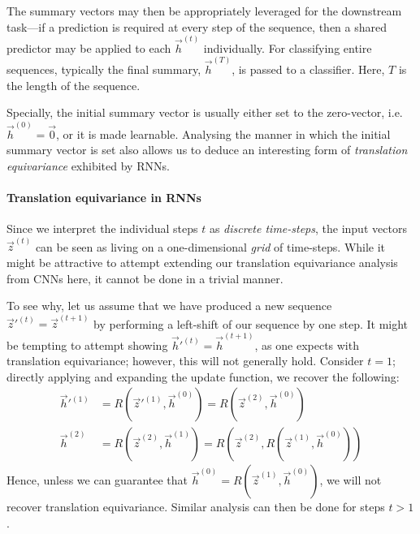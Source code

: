 The summary vectors may then be appropriately leveraged for the downstream task---if
a prediction is required at every step of the sequence, then a shared predictor may be applied
to each $\vec{h}^{(t)}$ individually. For classifying entire sequences, typically the final summary, $\vec{h}^{(T)}$, is passed to a classifier. Here, $T$ is the length of the sequence.

Specially, the initial summary vector is usually either set to the zero-vector, i.e. $\vec{h}^{(0)}=\vec{0}$, or it is made learnable. Analysing the manner in which the initial summary vector is set also allows us to deduce an interesting form of \emph{translation equivariance} exhibited by RNNs.

\paragraph{Translation equivariance in RNNs} Since we interpret the individual steps $t$ as \emph{discrete time-steps}, the input vectors $\vec{z}^{(t)}$ can be seen as living on a one-dimensional \emph{grid} of time-steps. While it might be attractive to attempt extending our translation equivariance analysis from CNNs here, it cannot be done in a trivial manner. 

To see why, let us assume that we have produced a new sequence $\vec{z}'^{(t)} = \vec{z}^{(t+1)}$ by performing a left-shift of our sequence by one step. %
It might be tempting to attempt showing $\vec{h}'^{(t)} = \vec{h}^{(t+1)}$, as one expects with translation equivariance; however, this will not generally hold. Consider $t = 1$; directly applying and expanding the update function, we recover the following:
\begin{align}\label{eqn:shiftrnn}
    \vec{h}'^{(1)} &= R(\vec{z}'^{(1)}, \vec{h}^{(0)}) = R(\vec{z}^{(2)}, \vec{h}^{(0)})\\ 
    \vec{h}^{(2)} &= R(\vec{z}^{(2)}, \vec{h}^{(1)}) = R(\vec{z}^{(2)}, R(\vec{z}^{(1)}, \vec{h}^{(0)}))\label{eqn:shiftrnn2} 
\end{align}
Hence, unless we can guarantee that $\vec{h}^{(0)} = R(\vec{z}^{(1)}, \vec{h}^{(0)})$, we will not recover translation equivariance. Similar analysis can then be done for steps $t > 1$. 

